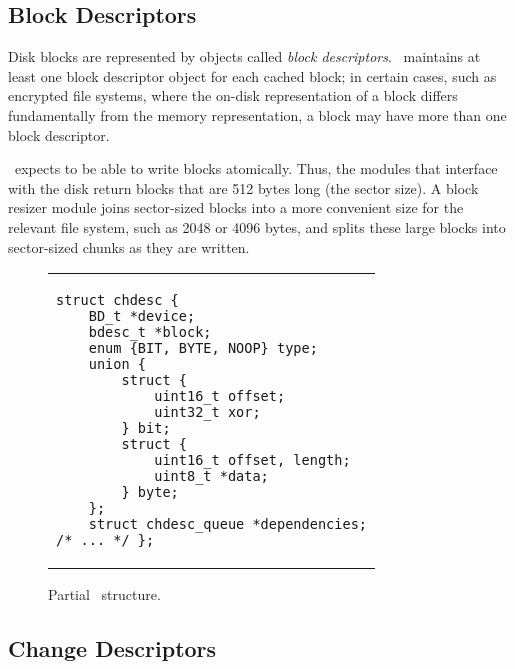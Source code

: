 
\subsection{Block Descriptors}

Disk blocks are represented by objects called \emph{block descriptors}.
%
\Kudos\ maintains at least one block descriptor object for each cached
 block; in certain cases, such as encrypted file systems, where the on-disk
 representation of a block differs fundamentally from the memory
 representation, a block may have more than one block descriptor.


\Kudos\ expects to be able to write blocks atomically.
%
Thus, the modules that interface with the disk return blocks that are 512
 bytes long (the sector size).
%
A block resizer module joins sector-sized blocks into a more convenient
 size for the relevant file system, such as 2048 or 4096 bytes, and splits
 these large blocks into sector-sized chunks as they are written.


\begin{figure}[t]
\vskip-14pt
\begin{tabular}{@{\hskip0.58in}p{2in}@{}}
\begin{scriptsize}
\begin{verbatim}
struct chdesc {
    BD_t *device;
    bdesc_t *block;
    enum {BIT, BYTE, NOOP} type;
    union {
        struct {
            uint16_t offset;
            uint32_t xor;
        } bit;
        struct {
            uint16_t offset, length;
            uint8_t *data;
        } byte;
    };
    struct chdesc_queue *dependencies;
/* ... */ };
\end{verbatim}
\end{scriptsize}
\end{tabular}
\vspace{-10pt}
\caption{\label{fig:chdesc} Partial \chdesc\ structure.}
\end{figure}


\subsection {Change Descriptors}
\label{sec:design:chdescs}



